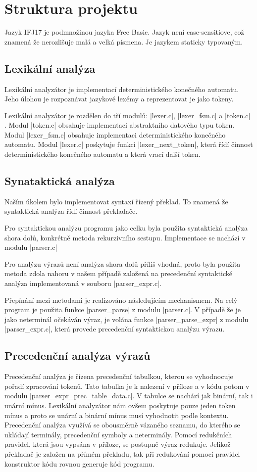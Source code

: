 \section{Struktura projektu}
Jazyk IFJ17 je podmnožinou jazyka Free Basic. Jazyk není case-sensitiove,
což znamená že nerozlišuje malá a velká písmena. Je jazykem staticky typovaným.
\subsection{Lexikální analýza}
Lexikální analyzátor je implementací deterministického konečného
automatu. Jeho úlohou je rozpoznávat jazykové lexémy a reprezentovat
je jako tokeny.

Lexikální analyzátor je rozdělen do tří modulů: \ic|lexer.c|, \ic|lexer_fsm.c| a \ic|token.c|
. Modul \ic|token.c| obsahuje implementaci abstraktního datového typu token. Modul \ic|lexer_fsm.c|
obsahuje implementaci deterministického konečného automatu. Modul \ic|lexer.c| poskytuje funkci
\ic|lexer_next_token|, která řídí činnost deterministického konečného automatu a
která vrací další token.

\subsection{Synataktická analýza}
Naším úkolem bylo implementovat syntaxí řízený překlad. To znamená
že syntaktická analýza řídí činnost překladače.

Pro syntaktickou analýzu programu jako celku byla použita syntaktická
analýza shora dolů, konkrétně metoda rekurzivního sestupu. Implementace se nachází v modulu \ic|parser.c|

Pro analýzu výrazů není analýza shora dolů příliš vhodná, proto byla
použita metoda zdola nahoru v našem případě založená na precedenční
syntaktické analýza implementovaná v souboru \ic|parser_expr.c|.

Přepínání mezi metodami je realizováno následujícím mechanismem. Na celý program je použita funkce \ic|parser_parse|
z modulu \ic|parser.c|. V případě že je jako neterminál očekáván výraz, je volána funkce \ic|parser_parse_expr|
z modulu \ic|parser_expr.c|, která provede precedenční syntaktickou analýzu výrazu.

\subsection{Precedenční analýza výrazů}
Precedenční analýza je řízena precedenční tabulkou, kterou se vyhodnocuje pořadí zpracování tokenů. Tato tabulka je k nalezení v příloze a v kódu potom v modulu 
\ic|parser_expr_prec_table_data.c|. V tabulce se nachází jak binární, tak i unární mínus. 
Lexikální analyzátor nám ovšem poskytuje pouze jeden token mínus a proto se unární a binární mínus 
musí vyhodnotit podle kontextu. Precedenční analýza využívá se obousměrně vázaného seznamu, do kterého se ukládají terminály, 
precedenční symboly a neterminály. Pomocí redukčních pravidel, která jsou vypsána v příloze, se postupně výraz redukuje. 
Jelikož překladač je založen na přímém překladu, tak při redukování pomocí pravidel konstruktor kódu rovnou generuje kód programu.

